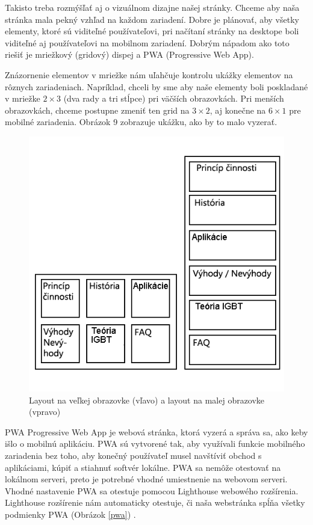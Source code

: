 Takisto treba rozmýšľať aj o vizuálnom dizajne  našej stránky. Chceme aby naša  stránka mala pekný vzhľad na každom zariadení. Dobre je plánovať, aby všetky elementy, ktoré sú viditeľné používateľovi, pri načítaní stránky na desktope boli viditeľné aj používateľovi na mobilnom zariadení. Dobrým nápadom ako toto riešiť je mriežkový (gridový) dispej a PWA (Progressive Web App).

Znázornenie elementov v mriežke nám uľahčuje kontrolu ukážky elementov na rôznych zariadeniach. Napríklad, chceli by sme aby naše elementy boli poskladané v mriežke $2\times 3$ (dva rady a tri stĺpce) pri väčších obrazovkách. Pri menších obrazovkách, chceme postupne zmeniť ten grid na $3\times 2$, aj konečne na $6\times 1$ pre mobilné zariadenia. Obrázok 9 zobrazuje ukážku, ako by to malo vyzerať.

\begin{figure}[!htbp]
    \centering
    \includegraphics[width=12cm]{img/Layout.png}
    \caption{Layout na veľkej obrazovke (vľavo) a layout na malej obrazovke (vpravo)}
    \label{Layout}
\end{figure}

\acrshort{PWA} Progressive Web App je webová stránka, ktorá vyzerá a správa sa, ako keby išlo o mobilnú aplikáciu. PWA sú vytvorené tak, aby využívali funkcie mobilného zariadenia bez toho, aby konečný používateľ musel navštíviť obchod s aplikáciami, kúpiť a stiahnuť softvér lokálne. PWA sa nemôže otestovať na lokálnom serveri, preto je potrebné vhodné umiestnenie na webovom serveri. Vhodné nastavenie PWA sa otestuje pomocou Lighthouse webowého rozšírenia. Lighthouse rozšírenie nám automaticky otestuje, či naša webstránka spĺňa všetky podmienky PWA (Obrázok \ref{pwa}) \cite{c26}.

